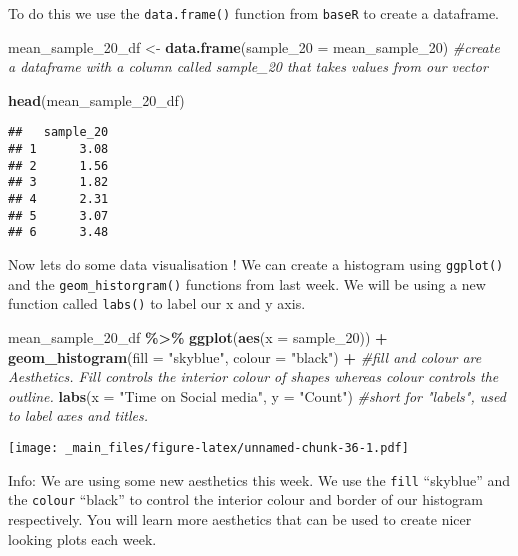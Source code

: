\documentclass[
]{book}
\newenvironment{Shaded}{\begin{snugshade}}{\end{snugshade}}
\newcommand{\AttributeTok}[1]{\textcolor[rgb]{0.13,0.29,0.53}{#1}}
\newcommand{\CommentTok}[1]{\textcolor[rgb]{0.56,0.35,0.01}{\textit{#1}}}
\newcommand{\FunctionTok}[1]{\textcolor[rgb]{0.13,0.29,0.53}{\textbf{#1}}}
\newcommand{\NormalTok}[1]{#1}
\newcommand{\OtherTok}[1]{\textcolor[rgb]{0.56,0.35,0.01}{#1}}
\newcommand{\SpecialCharTok}[1]{\textcolor[rgb]{0.81,0.36,0.00}{\textbf{#1}}}
\newcommand{\StringTok}[1]{\textcolor[rgb]{0.31,0.60,0.02}{#1}}
\begin{document}
To do this we use the \texttt{data.frame()} function from \texttt{baseR} to create a dataframe.

\begin{Shaded}
\begin{Highlighting}[]
\NormalTok{mean\_sample\_20\_df }\OtherTok{\textless{}{-}} \FunctionTok{data.frame}\NormalTok{(}\AttributeTok{sample\_20 =}\NormalTok{ mean\_sample\_20) }\CommentTok{\#create a dataframe with a column called sample\_20 that takes values from our vector}

\FunctionTok{head}\NormalTok{(mean\_sample\_20\_df)}
\end{Highlighting}
\end{Shaded}

\begin{verbatim}
##   sample_20
## 1      3.08
## 2      1.56
## 3      1.82
## 4      2.31
## 5      3.07
## 6      3.48
\end{verbatim}

Now lets do some data visualisation ! We can create a histogram using \texttt{ggplot()} and the \texttt{geom\_historgram()} functions from last week. We will be using a new function called \texttt{labs()} to label our x and y axis.

\begin{Shaded}
\begin{Highlighting}[]
\NormalTok{mean\_sample\_20\_df }\SpecialCharTok{\%\textgreater{}\%} 
  \FunctionTok{ggplot}\NormalTok{(}\FunctionTok{aes}\NormalTok{(}\AttributeTok{x =}\NormalTok{ sample\_20)) }\SpecialCharTok{+}
  \FunctionTok{geom\_histogram}\NormalTok{(}\AttributeTok{fill =} \StringTok{"skyblue"}\NormalTok{, }\AttributeTok{colour =} \StringTok{"black"}\NormalTok{) }\SpecialCharTok{+}  \CommentTok{\#fill and colour are Aesthetics. Fill controls the interior colour of shapes whereas colour controls the outline. }
  \FunctionTok{labs}\NormalTok{(}\AttributeTok{x =} \StringTok{"Time on Social media"}\NormalTok{, }\AttributeTok{y =} \StringTok{"Count"}\NormalTok{) }\CommentTok{\#short for "labels", used to label axes and titles.}
\end{Highlighting}
\end{Shaded}

\texttt{[image: \_main\_files/figure-latex/unnamed-chunk-36-1.pdf]}

Info: We are using some new aesthetics this week. We use the \texttt{fill} ``skyblue'' and the \texttt{colour} ``black'' to control the interior colour and border of our histogram respectively. You will learn more aesthetics that can be used to create nicer looking plots each week.
\end{document}
